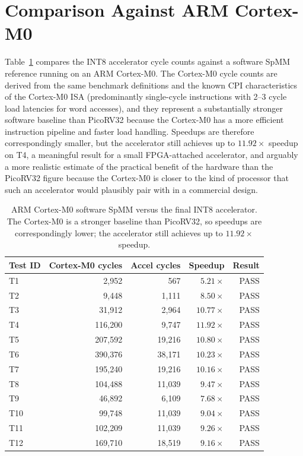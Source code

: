 \section{Comparison Against ARM Cortex-M0}

Table~\ref{tab:cortex-results} compares the INT8 accelerator cycle counts
against a software SpMM reference running on an ARM Cortex-M0. The
Cortex-M0 cycle counts are derived from the same benchmark definitions
and the known CPI characteristics of the Cortex-M0 ISA (predominantly
single-cycle instructions with 2--3 cycle load latencies for word
accesses), and they represent a substantially stronger software baseline
than PicoRV32 because the Cortex-M0 has a more efficient instruction
pipeline and faster load handling. Speedups are therefore correspondingly
smaller, but the accelerator still achieves up to $11.92\times$ speedup
on T4, a meaningful result for a small FPGA-attached accelerator, and
arguably a more realistic estimate of the practical benefit of the
hardware than the PicoRV32 figure because the Cortex-M0 is closer to the
kind of processor that such an accelerator would plausibly pair with in
a commercial design.

\begin{table}[htbp]
  \centering
  \small
  \begin{tabular}{lrrrr}
  \toprule
  Test ID & Cortex-M0 cycles & Accel cycles & Speedup & Result \\
  \midrule
  T1  & 2,952   &    567 & $5.21\times$  & PASS \\
  T2  & 9,448   &  1,111 & $8.50\times$  & PASS \\
  T3  & 31,912  &  2,964 & $10.77\times$ & PASS \\
  T4  & 116,200 &  9,747 & $\mathbf{11.92\times}$ & PASS \\
  T5  & 207,592 & 19,216 & $10.80\times$ & PASS \\
  T6  & 390,376 & 38,171 & $10.23\times$ & PASS \\
  T7  & 195,240 & 19,216 & $10.16\times$ & PASS \\
  T8  & 104,488 & 11,039 & $9.47\times$  & PASS \\
  T9  & 46,892  &  6,109 & $7.68\times$  & PASS \\
  T10 & 99,748  & 11,039 & $9.04\times$  & PASS \\
  T11 & 102,209 & 11,039 & $9.26\times$  & PASS \\
  T12 & 169,710 & 18,519 & $9.16\times$  & PASS \\
  \bottomrule
  \end{tabular}
  \caption{ARM Cortex-M0 software SpMM versus the final INT8 accelerator.
           The Cortex-M0 is a stronger baseline than PicoRV32, so
           speedups are correspondingly lower; the accelerator still
           achieves up to $11.92\times$ speedup.}
  \label{tab:cortex-results}
\end{table}

